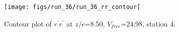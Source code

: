 \begin{figure}[H]
\centering
\texttt{[image: figs/run\_36/run\_36\_rr\_contour]}
\caption{Contour plot of $\overline{r^\prime r^\prime}$ at $z/c$=8.50, $V_{free}$=24.98, station 4.}
\label{fig:run_36_rr_contour}
\end{figure}


